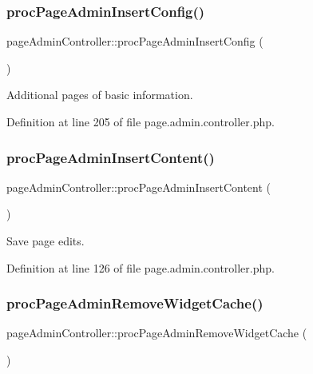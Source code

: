\subsubsection{\texorpdfstring{proc\+Page\+Admin\+Insert\+Config()}{procPageAdminInsertConfig()}}
{\footnotesize\ttfamily page\+Admin\+Controller\+::proc\+Page\+Admin\+Insert\+Config (\begin{DoxyParamCaption}{ }\end{DoxyParamCaption})}



Additional pages of basic information. 



Definition at line 205 of file page.\+admin.\+controller.\+php.

\hypertarget{classpageAdminController_a95d451eb68ffc5dd783a464d955724ac}{}\label{classpageAdminController_a95d451eb68ffc5dd783a464d955724ac} 
\subsubsection{\texorpdfstring{proc\+Page\+Admin\+Insert\+Content()}{procPageAdminInsertContent()}}
{\footnotesize\ttfamily page\+Admin\+Controller\+::proc\+Page\+Admin\+Insert\+Content (\begin{DoxyParamCaption}{ }\end{DoxyParamCaption})}



Save page edits. 



Definition at line 126 of file page.\+admin.\+controller.\+php.

\hypertarget{classpageAdminController_a06b9c3a3052e15aa783e319c49ea8039}{}\label{classpageAdminController_a06b9c3a3052e15aa783e319c49ea8039} 
\subsubsection{\texorpdfstring{proc\+Page\+Admin\+Remove\+Widget\+Cache()}{procPageAdminRemoveWidgetCache()}}
{\footnotesize\ttfamily page\+Admin\+Controller\+::proc\+Page\+Admin\+Remove\+Widget\+Cache (\begin{DoxyParamCaption}{ }\end{DoxyParamCaption})}



